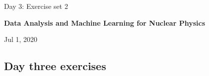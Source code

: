 \documentclass[%
oneside,                 %
final,                   %
10pt]{article}
\begin{document}

\newcommand{\exercisesection}[1]{\subsection*{#1}}






\thispagestyle{empty}

\begin{center}
{\LARGE\bf
\begin{spacing}{1.25}
Day 3: Exercise set 2
\end{spacing}
}
\end{center}


\begin{center}
{\bf Data Analysis and Machine Learning for Nuclear Physics${}^{}$} \\ [0mm]
\end{center}

\begin{center}
\end{center}
    

\begin{center}
Jul 1, 2020
\end{center}

\vspace{1cm}


\subsection*{Day three exercises}
\end{document}
